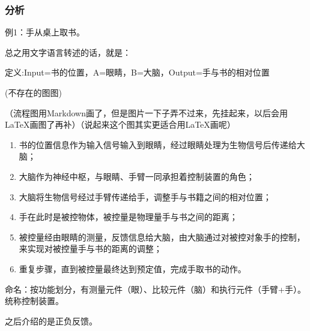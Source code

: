 \documentclass[oneside,a4paper]{ctexbook}
\begin{document}
\subsubsection{分析}
例1：手从桌上取书。

总之用文字语言转述的话，就是：

定义:Input=书的位置，A=眼睛，B=大脑，Output=手与书的相对位置

    (不存在的图图)%
    
    （流程图用Markdown画了，但是图片一下子弄不过来，先挂起来，以后会用LaTeX画图了再补）（说起来这个图其实更适合用\LaTeX 画呢）

\begin{enumerate}    
    \item 书的位置信息作为输入信号输入到眼睛，经过眼睛处理为生物信号后传递给大脑；
    \item 大脑作为神经中枢，与眼睛、手臂一同承担着控制装置的角色；
    \item 大脑将生物信号经过手臂传递给手，调整手与书籍之间的相对位置；
    \item 手在此时是被控物体，被控量是物理量手与书之间的距离；
    \item 被控量经由眼睛的测量，反馈信息给大脑，由大脑通过对被控对象手的控制，来实现对被控量手与书的距离的调整；
    \item 重复步骤，直到被控量最终达到预定值，完成手取书的动作。
\end{enumerate}

命名：按功能划分，有测量元件（眼）、比较元件（脑）和执行元件（手臂+手）。统称控制装置。

之后介绍的是正负反馈。
\end{document}
